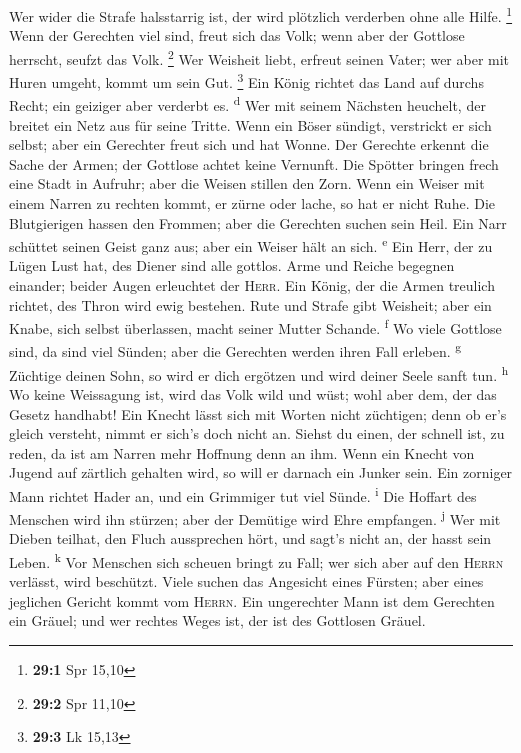  Wer wider die Strafe halsstarrig ist, der wird plötzlich
verderben ohne alle Hilfe. \footnote{\textbf{29:1} Spr 15,10}
 Wenn der Gerechten viel sind, freut sich das Volk; wenn
aber der Gottlose herrscht, seufzt das Volk. \footnote{\textbf{29:2} Spr
  11,10}  Wer Weisheit liebt, erfreut seinen Vater; wer
aber mit Huren umgeht, kommt um sein Gut. \footnote{\textbf{29:3} Lk
  15,13}  Ein König richtet das Land auf durchs Recht; ein
geiziger aber verderbt es. \textsuperscript{d}  Wer mit
seinem Nächsten heuchelt, der breitet ein Netz aus für seine Tritte.
 Wenn ein Böser sündigt, verstrickt er sich selbst; aber
ein Gerechter freut sich und hat Wonne.  Der Gerechte
erkennt die Sache der Armen; der Gottlose achtet keine Vernunft.
 Die Spötter bringen frech eine Stadt in Aufruhr; aber die
Weisen stillen den Zorn.  Wenn ein Weiser mit einem Narren
zu rechten kommt, er zürne oder lache, so hat er nicht Ruhe.
 Die Blutgierigen hassen den Frommen; aber die Gerechten
suchen sein Heil.  Ein Narr schüttet seinen Geist ganz
aus; aber ein Weiser hält an sich. \textsuperscript{e} 
Ein Herr, der zu Lügen Lust hat, des Diener sind alle gottlos.
 Arme und Reiche begegnen einander; beider Augen
erleuchtet der \textsc{Herr}.  Ein König, der die Armen
treulich richtet, des Thron wird ewig bestehen.  Rute und
Strafe gibt Weisheit; aber ein Knabe, sich selbst überlassen, macht
seiner Mutter Schande. \textsuperscript{f}  Wo viele
Gottlose sind, da sind viel Sünden; aber die Gerechten werden ihren Fall
erleben. \textsuperscript{g}  Züchtige deinen Sohn, so
wird er dich ergötzen und wird deiner Seele sanft tun.
\textsuperscript{h}  Wo keine Weissagung ist, wird das
Volk wild und wüst; wohl aber dem, der das Gesetz handhabt!
 Ein Knecht lässt sich mit Worten nicht züchtigen; denn
ob er's gleich versteht, nimmt er sich's doch nicht an. 
Siehst du einen, der schnell ist, zu reden, da ist am Narren mehr
Hoffnung denn an ihm.  Wenn ein Knecht von Jugend auf
zärtlich gehalten wird, so will er darnach ein Junker sein.
 Ein zorniger Mann richtet Hader an, und ein Grimmiger
tut viel Sünde. \textsuperscript{i}  Die Hoffart des
Menschen wird ihn stürzen; aber der Demütige wird Ehre empfangen.
\textsuperscript{j}  Wer mit Dieben teilhat, den Fluch
aussprechen hört, und sagt's nicht an, der hasst sein Leben.
\textsuperscript{k}  Vor Menschen sich scheuen bringt zu
Fall; wer sich aber auf den \textsc{Herrn} verlässt, wird beschützt.
 Viele suchen das Angesicht eines Fürsten; aber eines
jeglichen Gericht kommt vom \textsc{Herrn}.  Ein
ungerechter Mann ist dem Gerechten ein Gräuel; und wer rechtes Weges
ist, der ist des Gottlosen Gräuel.

